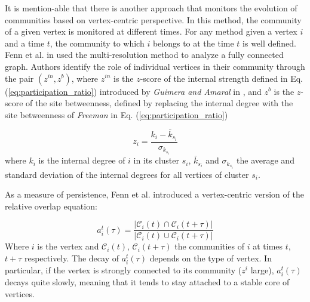 It is mention-able that there is another approach that monitors the evolution of communities based on vertex-centric perspective. In this method, the community of a given vertex is monitored at different times. For any method given a vertex $i$ and a time $t$, the community to which $i$ belongs to at the time $t$ is well defined. Fenn et al. in \cite{ref-55} used the multi-resolution method to analyze a fully connected graph. Authors identify the role of individual vertices in their community through the pair $(z^{in}, z^b)$, where $z^{in}$ is the $z$-score of the internal strength defined in Eq. (\ref{eq:participation_ratio}) introduced by \textit{Guimera and Amaral} in \cite{ref-56}, and $z^b$  is the $z$-score of the site betweenness, defined by replacing the internal degree with the site betweenness of \textit{Freeman} \cite{ref-11} in Eq. (\ref{eq:participation_ratio})

\begin{equation}\label{eq:participation_ratio}
z_i = \dfrac{k_i - \bar{k}_{s_{i}}}{\sigma_{k_{s_{i}}}}
\end{equation}
where $k_i$ is the internal degree of $i$ in its cluster $s_i$, $\bar{k}_{s_{i}}$ and $\sigma_{k_{s_{i}}}$ the average and standard deviation of the internal degrees for all vertices of cluster $s_{i}$.

As a measure of persistence, Fenn et al. introduced a vertex-centric version of the relative overlap equation:

\begin{equation}
a_i^t(\tau) = \dfrac{\lvert\mathcal{C}_i(t) \cap \mathcal{C}_i(t+\tau)\rvert}{\lvert\mathcal{C}_i(t) \cup \mathcal{C}_i(t+\tau)\rvert}
\end{equation}
Where $i$ is the vertex and $\mathcal{C}_i(t)$, $\mathcal{C}_i(t+\tau)$ the communities of $i$ at times $t$, $t+\tau$ respectively. The decay of $a_i^t(\tau)$ depends on the type of vertex. In particular, if the vertex is strongly connected to its community ($z^i$ large), $a_i^t(\tau)$ decays quite slowly, meaning that it tends to stay attached to a stable core of vertices.